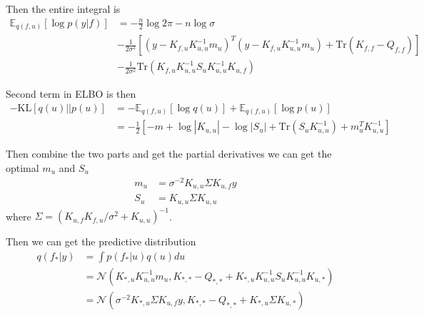 \documentclass[10pt]{elegantbook}
\begin{document}
Then the entire integral is
\begin{equation}
    \begin{aligned}
        \mathbb E_{q(f, u)} \left [ \log p(y|f) \right ] &= -\frac{n}{2} \log 2\pi - n \log \sigma \\
        &- \frac{1}{2\sigma^2} \left [ (y - K_{f, u}K_{u, u}^{-1}m_u)^T(y - K_{f, u}K_{u, u}^{-1}m_u) + \text{Tr}(K_{f, f} - Q_{f, f}) \right ] \\
        &- \frac{1}{2\sigma^2} \text{Tr}(K_{f, u}K_{u, u}^{-1}S_u K_{u, u}^{-1}K_{u, f})
    \end{aligned}
\end{equation}

Second term in ELBO is then
\begin{equation}
    \begin{aligned}
        -\text{KL} \left [q(u) || p(u) \right ] &=
        -\mathbb E_{q(f, u)} \left [ \log q(u) \right ] + \mathbb E_{q(f, u)} \left [ \log p(u) \right ] \\
        &= -\frac{1}{2} \left [ -m + \log |K_{u, u}| - \log |S_u| + \text{Tr}(S_u K_{u, u}^{-1}) + m_u^T K_{u, u}^{-1} \right ]
    \end{aligned}
\end{equation}

Then combine the two parts and get the partial derivatives we can get the optimal $m_u$ and $S_u$
\begin{equation}
    \begin{aligned}
        m_u &= \sigma^{-2} K_{u, u} \Sigma K_{u, f} y \\
        S_u &= K_{u, u} \Sigma K_{u, u}
    \end{aligned}
\end{equation}
where $\Sigma = (K_{u, f} K_{f, u} / \sigma^2 + K_{u, u})^{-1}$.

Then we can get the predictive distribution
\begin{equation}
    \begin{aligned}
        q(f_* | y) &= \int p(f_* | u) q(u) du \\
        &= \mathcal N (K_{*, u} K_{u, u}^{-1} m_u, K_{*, *} - Q_{*, *} + K_{*, u} K_{u, u}^{-1} S_u K_{u, u}^{-1} K_{u, *}) \\
        &= \mathcal N (\sigma^{-2} K_{*, u} \Sigma K_{u, f} y, K_{*, *} - Q_{*, *} + K_{*, u} \Sigma K_{u, *})
    \end{aligned}
\end{equation}
\end{document}
